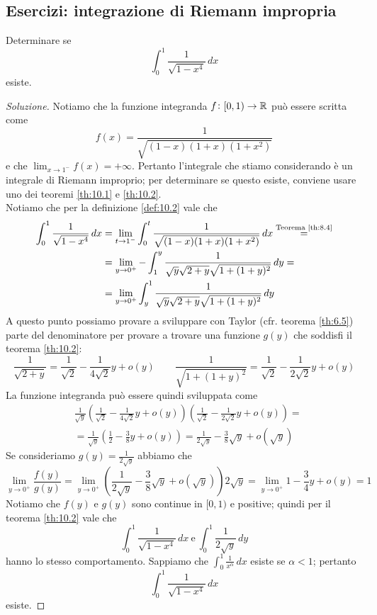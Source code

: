\subsection{Esercizi: integrazione di Riemann impropria}
\begin{exercise}
    \label{ex:10.1}
    Determinare se
    \[
    \int_0^1 \frac{1}{\sqrt{1-x^4}}\, dx
    \]
    esiste.
\end{exercise}
\begin{proof}[Soluzione]
    Notiamo che la funzione integranda $f\colon[0,1)\to\amsbb{R}$ può essere scritta come
    \[
    f(x) = \frac{1}{\sqrt{(1-x)(1+x)(1+x^2)}}
    \]
    e che $\lim_{x\to 1^-} f(x) = +\infty$. Pertanto l'integrale che stiamo considerando è un integrale di Riemann improprio; per determinare se questo esiste, conviene usare uno dei teoremi \ref{th:10.1} e \ref{th:10.2}.\\
    Notiamo che per la definizione \ref{def:10.2} vale che
    \[
    \begin{split}
        \int_0^1 \frac{1}{\sqrt{1-x^4}}\, dx &= \lim_{t\to1^-} \int_0^t \frac{1}{\sqrt{(1-x)(1+x)(1+x^2)}}\, dx \overset{\text{Teorema \ref{th:8.4}}}{=} \\
        &=\lim_{y\to0^+} -\int_1^y \frac{1}{\sqrt{y}\sqrt{2+y}\sqrt{1+(1+y)^2}}\, dy = \\
        & = \lim_{y\to 0^+}\int_y^1 \frac{1}{\sqrt{y}\sqrt{2+y}\sqrt{1+(1+y)^2}}\, dy
    \end{split}
    \]
    A questo punto possiamo provare a sviluppare con Taylor (cfr. teorema \ref{th:6.5}) parte del denominatore per provare a trovare una funzione $g(y)$ che soddisfi il teorema \ref{th:10.2}:
    \[
    \frac{1}{\sqrt{2+y}} = \frac{1}{\sqrt{2}}-\frac{1}{4\sqrt{2}}y +o(y) \qquad \frac{1}{\sqrt{1+(1+y)^2}} = \frac{1}{\sqrt{2}}-\frac{1}{2\sqrt{2}}y +o(y)
    \]
    La funzione integranda può essere quindi sviluppata come
    \[
    \begin{split}
        & \frac{1}{\sqrt{y}}\left(\frac{1}{\sqrt{2}}-\frac{1}{4\sqrt{2}}y+o(y)\right)\left(\frac{1}{\sqrt{2}}-\frac{1}{2\sqrt{2}}y+o(y)\right) = \\
        & = \frac{1}{\sqrt{y}}\left(\frac{1}{2}-\frac{3}{8}y+o(y)\right) = \frac{1}{2\sqrt{y}}-\frac{3}{8}\sqrt{y}+o(\sqrt{y})
    \end{split}
    \]
    Se consideriamo $g(y) = \frac{1}{2\sqrt{y}}$ abbiamo che
    \[
    \lim_{y\to 0^+} \frac{f(y)}{g(y)} = \lim_{y\to 0^+} (\frac{1}{2\sqrt{y}}-\frac{3}{8}\sqrt{y}+o(\sqrt{y}))2\sqrt{y} = \lim_{y\to 0^+} 1 -\frac{3}{4}y+o(y) = 1
    \]
    Notiamo che $f(y)$ e $g(y)$ sono continue in $[0,1)$ e positive; quindi per il teorema \ref{th:10.2} vale che
    \[
    \int_0^1 \frac{1}{\sqrt{1-x^4}}\, dx \ \text{e} \ \int_0^1 \frac{1}{2\sqrt{y}}\, dy
    \]
    hanno lo stesso comportamento. Sappiamo che $\int_0^1 \frac{1}{x^\alpha}\, dx$ esiste se $\alpha<1$; pertanto 
    \[
    \int_0^1 \frac{1}{\sqrt{1-x^4}}\, dx
    \]
    esiste.
\end{proof}
